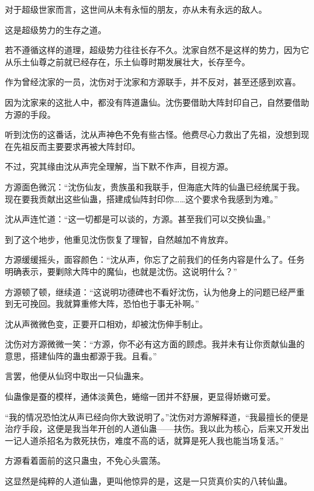 
\begin{this_body}



对于超级世家而言，这世间从未有永恒的朋友，亦从未有永远的敌人。

这是超级势力的生存之道。

若不遵循这样的道理，超级势力往往长存不久。沈家自然不是这样的势力，因为它从乐土仙尊之前就已经存在，乐土仙尊时期发展壮大，长存至今。

作为曾经沈家的一员，沈伤对于沈家和方源联手，并不反对，甚至还感到欢喜。

因为沈家来的这批人中，都没有阵道蛊仙。沈伤要借助大阵封印自己，自然要借助方源的手段。

听到沈伤的这番话，沈从声神色不免有些古怪。他费尽心力救出了先祖，没想到现在先祖反而主要要求再被大阵封印。

不过，究其缘由沈从声完全理解，当下默不作声，目视方源。

方源面色微沉：“沈伤仙友，贵族虽和我联手，但海底大阵的仙蛊已经统属于我。现在要我贡献出这些仙蛊，搭建成仙阵封印你……这个要求令我感到为难。”

沈从声连忙道：“这一切都是可以谈的，方源。甚至我们可以交换仙蛊。”

到了这个地步，他重见沈伤恢复了理智，自然越加不肯放弃。

方源缓缓摇头，面容颜色：“沈从声，你忘了之前我们的任务内容是什么了。任务明确表示，要剿除大阵中的魔仙，也就是沈伤。这说明什么？”

方源顿了顿，继续道：“这说明功德碑也不看好沈伤，认为他身上的问题已经严重到无可挽回。我就算重修大阵，恐怕也于事无补啊。”

沈从声微微色变，正要开口相劝，却被沈伤伸手制止。

沈伤对方源微微一笑：“方源，你不必有这方面的顾虑。我并未有让你贡献仙蛊的意思，搭建仙阵的蛊虫都源于我。且看。”

言罢，他便从仙窍中取出一只仙蛊来。

仙蛊像是蚕的模样，通体淡黄色，蜷缩一团并不舒展，更显得娇嫩可爱。

“我的情况恐怕沈从声已经向你大致说明了。”沈伤对方源解释道，“我最擅长的便是治疗手段，这便是我当年开创的人道仙蛊——扶伤。我以此为核心，后来又开发出一记人道杀招名为救死扶伤，难度不高的话，就算是死人我也能当场复活。”

方源看着面前的这只蛊虫，不免心头震荡。

这显然是纯粹的人道仙蛊，更叫他惊异的是，这是一只货真价实的八转仙蛊。


\end{this_body}
